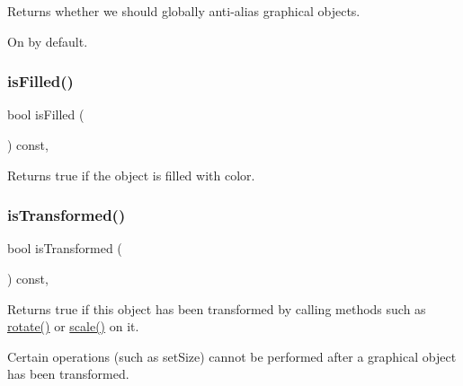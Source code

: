 Returns whether we should globally anti-\/alias graphical objects. 

On by default. \mbox{\label{classsgl_1_1GObject_a11c404f106940c201b6f326e0355c150}} 
\subsubsection{\texorpdfstring{is\+Filled()}{isFilled()}}
{\footnotesize\ttfamily bool is\+Filled (\begin{DoxyParamCaption}{ }\end{DoxyParamCaption}) const\hspace{0.3cm}{\ttfamily [virtual]}, {\ttfamily [inherited]}}



Returns {\ttfamily true} if the object is filled with color. 

\mbox{\label{classsgl_1_1GObject_a9de207581cfa4ca1eaa06da5f29b75fc}} 
\subsubsection{\texorpdfstring{is\+Transformed()}{isTransformed()}}
{\footnotesize\ttfamily bool is\+Transformed (\begin{DoxyParamCaption}{ }\end{DoxyParamCaption}) const\hspace{0.3cm}{\ttfamily [virtual]}, {\ttfamily [inherited]}}



Returns {\ttfamily true} if this object has been transformed by calling methods such as \mbox{\hyperlink{classsgl_1_1GObject_ae1ffaa12185dfd5ba464f7d87c329e26}{rotate()}} or \mbox{\hyperlink{classsgl_1_1GObject_ad2e1900f730475c2d044817db03b38d6}{scale()}} on it. 

Certain operations (such as set\+Size) cannot be performed after a graphical object has been transformed. \mbox{\label{classsgl_1_1GObject_a9d8a6cfb13917785c143e74d40e4e2be}} 
